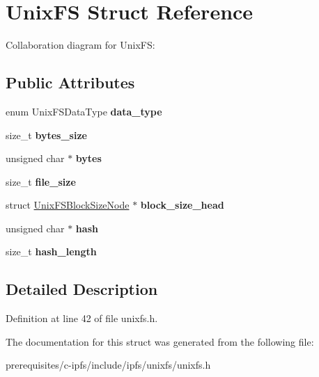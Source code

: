 \hypertarget{struct_unix_f_s}{}\section{Unix\+FS Struct Reference}
\label{struct_unix_f_s}


Collaboration diagram for Unix\+FS\+:
\subsection*{Public Attributes}
\begin{DoxyCompactItemize}
\item 
\mbox{\label{struct_unix_f_s_a646479570eed28b5f065c67605621f23}} 
enum Unix\+F\+S\+Data\+Type {\bfseries data\+\_\+type}
\item 
\mbox{\label{struct_unix_f_s_a5332867aee8eb927f9b17b1a348ccf08}} 
size\+\_\+t {\bfseries bytes\+\_\+size}
\item 
\mbox{\label{struct_unix_f_s_ad13c5c9a489599dc8aec31e708b120ef}} 
unsigned char $\ast$ {\bfseries bytes}
\item 
\mbox{\label{struct_unix_f_s_a51bacb10c6c09fc721f992fbd430dcf8}} 
size\+\_\+t {\bfseries file\+\_\+size}
\item 
\mbox{\label{struct_unix_f_s_a3bbbfa46a164560903ed4d69c5993f3d}} 
struct \mbox{\hyperlink{struct_unix_f_s_block_size_node}{Unix\+F\+S\+Block\+Size\+Node}} $\ast$ {\bfseries block\+\_\+size\+\_\+head}
\item 
\mbox{\label{struct_unix_f_s_a824d3554e413c28616615135ee5be985}} 
unsigned char $\ast$ {\bfseries hash}
\item 
\mbox{\label{struct_unix_f_s_a0661a459491d9cdf346f2d6b5546e1fd}} 
size\+\_\+t {\bfseries hash\+\_\+length}
\end{DoxyCompactItemize}


\subsection{Detailed Description}


Definition at line 42 of file unixfs.\+h.



The documentation for this struct was generated from the following file\+:\begin{DoxyCompactItemize}
\item 
prerequisites/c-\/ipfs/include/ipfs/unixfs/unixfs.\+h\end{DoxyCompactItemize}
